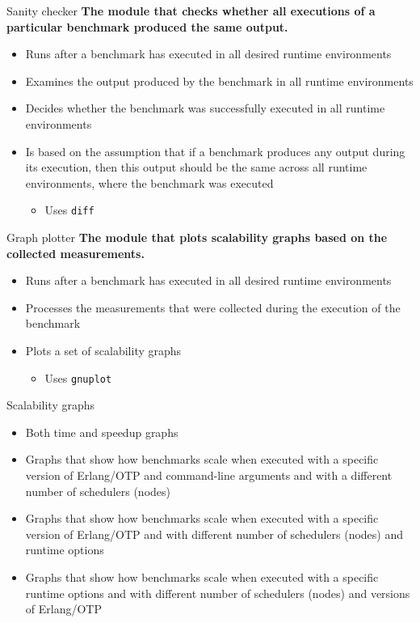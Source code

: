 \documentclass{beamer}
\begin{document}
\begin{frame}[t]{Sanity checker}
	{\bf The module that checks whether all executions of a particular benchmark produced the same output.}
    \begin{itemize}
		\item Runs \textcolor{burgundy}{after} a benchmark has executed in all desired runtime environments
		\item \textcolor{burgundy}{Examines} the output produced by the benchmark in all runtime environments
		\item Decides whether the benchmark was \textcolor{burgundy}{successfully executed} in all runtime environments
		\item Is based on the assumption that if a benchmark produces any output during its execution, then this output should be \textcolor{burgundy}{the same across all runtime environments}, where the benchmark was executed
			\begin{itemize}
				\item Uses \texttt{diff}
			\end{itemize}
    \end{itemize}
\end{frame}

\begin{frame}[t]{Graph plotter}
	{\bf The module that plots scalability graphs based on the collected measurements.}
    \begin{itemize}
		\item Runs \textcolor{burgundy}{after} a benchmark has executed in all desired runtime environments
		\item Processes the \textcolor{burgundy}{measurements} that were collected during the execution of the benchmark
		\item Plots a set of scalability graphs
			\begin{itemize}
				\item Uses \texttt{gnuplot}
			\end{itemize}
    \end{itemize}
\end{frame}

\begin{frame}[t]{Scalability graphs}
	\begin{itemize}
		\item Both \textcolor{burgundy}{time} and \textcolor{burgundy}{speedup} graphs
		\item Graphs that show how benchmarks scale when executed with a specific version of Erlang/OTP and command-line arguments and with a \textcolor{burgundy}{different number of schedulers (nodes)}
		\item Graphs that show how benchmarks scale when executed with a specific version of Erlang/OTP and with \textcolor{burgundy}{different number of schedulers (nodes) and runtime options}
		\item Graphs that show how benchmarks scale when executed with a specific runtime options and with \textcolor{burgundy}{different number of schedulers (nodes) and versions of Erlang/OTP}
	\end{itemize}
\end{frame}
\end{document}
